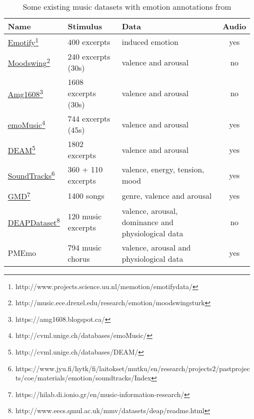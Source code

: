 \begin{savenotes}
\begin{table}[h!]
	\centering
	\begin{tabular}{|l|l|p{}|c|}
		\hline
		Name & Stimulus & Data & Audio\\ [0.5ex] 
		\hline\hline \href{http://www.projects.science.uu.nl/memotion/emotifydata/}{Emotify}\footnote{http://www.projects.science.uu.nl/memotion/emotifydata/}  & 400 excerpts & induced emotion & yes	\\ 
		\hline \href{http://music.ece.drexel.edu/research/emotion/moodswingsturk}{Moodswing}\footnote{http://music.ece.drexel.edu/research/emotion/moodswingsturk} & 240 excerpts (30s) & valence and arousal & no \\
		\hline \href{https://amg1608.blogspot.ca/}{Amg1608}\footnote{https://amg1608.blogspot.ca/} & 1608 excerpts (30s) & valence and arousal & no \\
		\hline \href{http://cvml.unige.ch/databases/emoMusic/}{emoMusic}\footnote{http://cvml.unige.ch/databases/emoMusic/} & 744 excerpts (45s) & valence and arousal & yes \\
		\hline \href{http://cvml.unige.ch/databases/DEAM/}{DEAM}\footnote{http://cvml.unige.ch/databases/DEAM/} & 1802 excerpts & valence and arousal & yes \\
		\hline \href{https://www.jyu.fi/hytk/fi/laitokset/mutku/en/research/projects2/pastprojects/coe/materials/emotion/soundtracks/Index}{SoundTracks}\footnote{https://www.jyu.fi/hytk/fi/laitokset/mutku/en/research/projects2/\newline pastprojects/coe/materials/emotion/soundtracks/Index} & 360 + 110 excerpts & valence, energy, tension, mood & yes \\
		\hline \href{https://hilab.di.ionio.gr/en/music-information-research/}{GMD}\footnote{https://hilab.di.ionio.gr/en/music-information-research/} & 1400 songs & genre, valence and arousal & yes \\
		\hline \href{http://www.eecs.qmul.ac.uk/mmv/datasets/deap/readme.html}{DEAPDataset}\footnote{http://www.eecs.qmul.ac.uk/mmv/datasets/deap/readme.html} & 120 music excerpts & valence, arousal, dominance and physiological data & no \\
		\hline PMEmo & 794 music chorus & valence, arousal and physiological data & yes \\
		\hline
	\end{tabular}
	\caption{Some existing music datasets with emotion annotations from \cite{zhang2018pmemo}}
	\label{table:datasets}
\end{table}
\end{savenotes}

